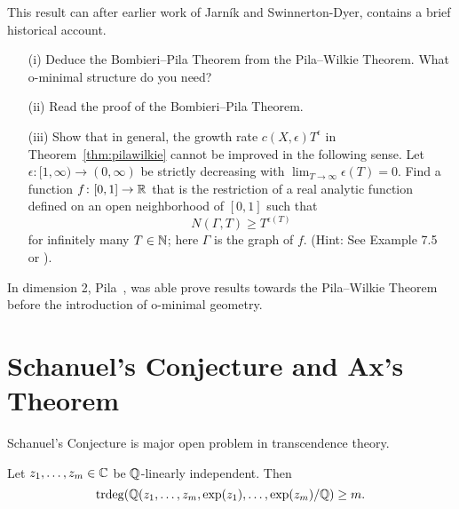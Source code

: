 This result can after earlier work of Jarn\'ik and Swinnerton-Dyer,
\cite{PilaWilkie} contains a brief historical account. 

\begin{exercise}
  \begin{enumerate}
  \item [(i)]  Deduce the Bombieri--Pila Theorem from the Pila--Wilkie Theorem.
    What o-minimal structure do you need? 
  \item[(ii)] Read the proof of the Bombieri--Pila Theorem.
  \item[(iii)] Show that in general, the growth rate
    $c(X,\epsilon)T^\epsilon$ in Theorem~\ref{thm:pilawilkie}
    cannot be improved in the following sense.
    Let $\epsilon \colon [1,\infty)\rightarrow (0,\infty)$ be strictly
    decreasing with $\lim_{T\rightarrow\infty}\epsilon(T)=0$. 
    Find a function $f\colon [0,1]\rightarrow {\mathbb{R}}$ that is the
    restriction of a real analytic function defined on an open
    neighborhood of $[0,1]$ such that
    $$
    N(\Gamma,T) \ge T^{\epsilon(T)}
    $$
    for infinitely many $T\in{\mathbb{N}}$; here $\Gamma$ is the graph of $f$.
    (Hint: See Example 7.5~\cite{Pila:Subanalytic} or \cite{Surroca:IMRN}). 
  \end{enumerate}
\end{exercise}

In dimension 2, Pila~\cite{Pila:Subanalytic}, was able prove
results towards the Pila--Wilkie Theorem before the introduction of
o-minimal geometry. 

\section{Schanuel's Conjecture and Ax's Theorem}

Schanuel's Conjecture is major open problem in transcendence theory.

\begin{conjecture}[Schanuel]
  Let $z_1,\ldots,z_m\in{\mathbb{C}}$ be ${\mathbb{Q}}$-linearly independent. Then
  \begin{equation*}
    \mathrm{trdeg}({\mathbb{Q}}(z_1,\ldots,z_m,\exp(z_1),\ldots,\exp(z_m)/{\mathbb{Q}}) \ge
    m. 
  \end{equation*}
\end{conjecture}

